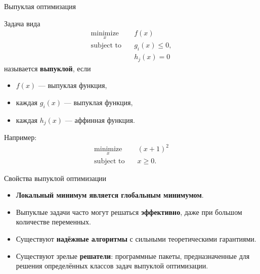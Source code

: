 \documentclass{beamer}
\begin{document}
\begin{frame}{Выпуклая оптимизация}
	\begin{flushleft}
		Задача вида
		\[
		\begin{aligned}
			\underset{x}{\text{minimize}}\quad & f(x)\\
			\text{subject to}\quad & g_i(x) \leq 0,\\
			& h_j(x) = 0
		\end{aligned}
		\]
		называется \textbf{выпуклой}, если
		
		\begin{itemize}
			\item $f(x)$ — выпуклая функция,
			\item каждая $g_i(x)$ — выпуклая функция,
			\item каждая $h_j(x)$ — аффинная функция.
		\end{itemize}
		
		\bigskip
		
		Например:
		\[
		\begin{aligned}
			\underset{x}{\text{minimize}}\quad &(x+1)^2\\
			\text{subject to}\quad &x \geq 0.
		\end{aligned}
		\]
		
	\end{flushleft}
\end{frame}


\begin{frame}{Свойства выпуклой оптимизации}
	\begin{flushleft}
		\begin{itemize}
			\item \textbf{Локальный минимум является глобальным минимумом}.
			
			\bigskip
			
			\item Выпуклые задачи часто могут решаться \textbf{эффективно}, даже при
			большом количестве переменных.
			
			\bigskip
			
			\item Существуют \textbf{надёжные алгоритмы} с сильными теоретическими
			гарантиями.
			
			\bigskip
			
			\item Существуют зрелые \textbf{решатели}: программные пакеты, предназначенные
			для решения определённых классов задач выпуклой оптимизации.
		\end{itemize}
		
	\end{flushleft}
\end{frame}
\end{document}
